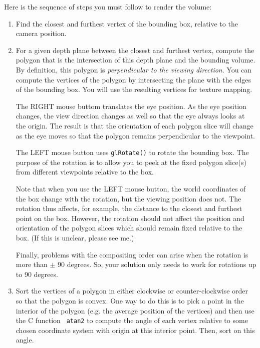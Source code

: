 \documentclass[12pt]{article}
\begin{document}
Here is the sequence of steps you must follow to render the volume:
\begin{enumerate}
\item  Find the closest and furthest vertex of the bounding box,
  relative to the camera position.  

\item For a given depth plane between the closest and furthest vertex,
  compute the polygon that is the intersection of this depth plane and
  the bounding volume.  By definition, this polygon is {\it
    perpendicular to the viewing direction}.  You can compute the
  vertices of the polygon by intersecting the plane with the edges of
  the bounding box.  You will use the resulting vertices for texture
  mapping.

  The RIGHT mouse buttom translates the eye
  position.  As the eye position changes, the view direction
  changes as well so that the eye always looks at the origin.  The
  result is that the orientation of each polygon slice will change as
  the eye moves so that the polygon remains perpendicular to the
  viewpoint.

  The LEFT mouse button uses {\tt glRotate()} to rotate the bounding
  box. The purpose of the rotation is to allow you to peek at the
  fixed polygon slice(s) from different viewpoints relative to the
  box.

Note that when you use the LEFT mouse button, the world coordinates of
the box change with the rotation, but the viewing position does not.
The rotation thus affects, for example, the distance to the closest
and furthest point on the box.  However, the rotation should not
affect the position and orientation of the polygon slices  which
  should remain fixed relative to the box.  (If this is unclear,
  please see me.)

Finally, problems with the compositing order can arise when the rotation is
  more than $\pm$ 90 degrees.  So, your solution only needs to work for
  rotations up to 90 degrees.

\item Sort the vertices of a polygon in either clockwise or
  counter-clockwise order so that the polygon is convex.  One way to
  do this is to pick a point in the interior of the polygon (e.g. the
  average position of the vertices) and then use the C function {\tt
    atan2} to compute the angle of each vertex relative to some chosen
  coordinate system with origin at this interior point.  Then, sort on this angle.


\end{enumerate}
\end{document}
